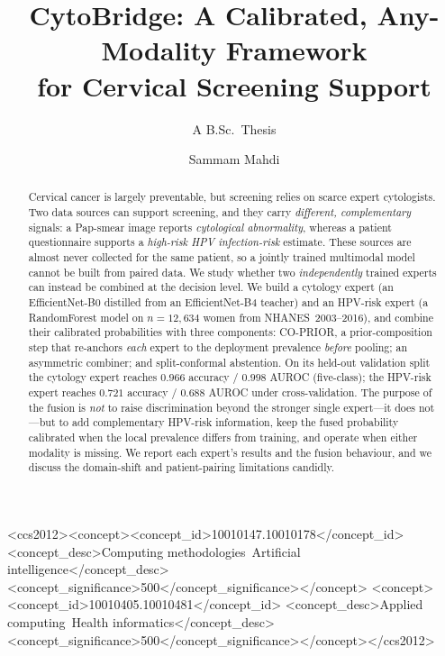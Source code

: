 \documentclass[sigplan,nonacm,screen]{acmart}
\begin{document}
\title{CytoBridge: A Calibrated, Any-Modality Framework\\ for Cervical Screening Support}
\subtitle{A B.Sc.\ Thesis}
\author{Sammam Mahdi}
\renewcommand{\shortauthors}{Mahdi}

\begin{abstract}
Cervical cancer is largely preventable, but screening relies on scarce expert cytologists. Two data sources
can support screening, and they carry \emph{different, complementary} signals: a Pap-smear image reports
\emph{cytological abnormality}, whereas a patient questionnaire supports a \emph{high-risk HPV infection-risk}
estimate. These sources are almost never collected for the same patient, so a jointly trained multimodal model
cannot be built from paired data. We study whether two \emph{independently} trained experts can instead be
combined at the decision level. We build a cytology expert (an EfficientNet-B0 distilled from an
EfficientNet-B4 teacher) and an HPV-risk expert (a RandomForest model on $n=12{,}634$ women from
NHANES~2003--2016), and combine their calibrated probabilities with three components: CO-PRIOR, a
prior-composition step that re-anchors \emph{each} expert to the deployment prevalence \emph{before} pooling;
an asymmetric combiner; and split-conformal abstention. On its held-out validation split the cytology expert
reaches $0.966$ accuracy / $0.998$ AUROC (five-class); the HPV-risk expert reaches $0.721$ accuracy / $0.688$
AUROC under cross-validation. The purpose of the fusion is \emph{not} to raise discrimination beyond the
stronger single expert---it does not---but to add complementary HPV-risk information, keep the fused
probability calibrated when the local prevalence differs from training, and operate when either modality is
missing. We report each expert's results and the fusion behaviour, and we discuss the domain-shift and
patient-pairing limitations candidly.
\end{abstract}

\begin{CCSXML}
<ccs2012><concept><concept_id>10010147.10010178</concept_id>
<concept_desc>Computing methodologies~Artificial intelligence</concept_desc>
<concept_significance>500</concept_significance></concept>
<concept><concept_id>10010405.10010481</concept_id>
<concept_desc>Applied computing~Health informatics</concept_desc>
<concept_significance>500</concept_significance></concept></ccs2012>
\end{CCSXML}
\maketitle
\end{document}
